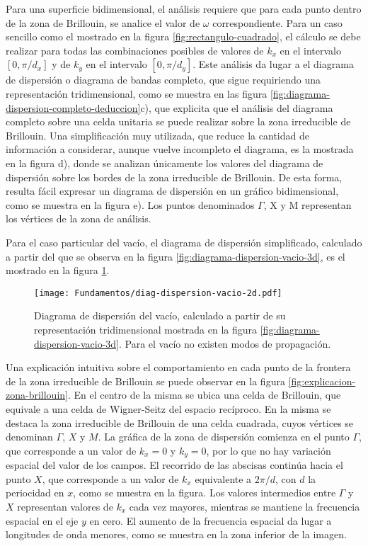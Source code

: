 Para una superficie bidimensional, el análisis requiere que para cada punto dentro de la zona de Brillouin, se analice el valor de $\omega$ correspondiente. Para un caso sencillo como el mostrado en la figura \ref{fig:rectangulo-cuadrado}, el cálculo se debe realizar para todas las combinaciones posibles de valores de $k_x$ en el intervalo $[0,\pi/d_x]$ y de $k_y$ en el intervalo $[0,\pi/d_y]$. Este análisis da lugar a el diagrama de dispersión o diagrama de bandas completo, que sigue requiriendo una representación tridimensional, como se muestra en las figura \ref{fig:diagrama-dispersion-completo-deduccion}c), que explicita que el análisis del diagrama completo sobre una celda unitaria se puede realizar sobre la zona irreducible de Brillouin. Una simplificación muy utilizada, que reduce la cantidad de información a considerar, aunque vuelve incompleto el diagrama, es la mostrada en la figura d), donde se analizan únicamente los valores del diagrama de dispersión sobre los bordes de la zona irreducible de Brillouin. De esta forma, resulta fácil expresar un diagrama de dispersión en un gráfico bidimensional, como se muestra en la figura e). Los puntos denominados $\Gamma$, X y M representan los vértices de la zona de análisis.

Para el caso particular del vacío, el diagrama de dispersión simplificado, calculado a partir del que se observa en la figura \ref{fig:diagrama-dispersion-vacio-3d}, es el mostrado en la figura \ref{fig:diagrama-dispersion-vacio-2d}.

\begin{figure}[h]
	\centering
	\texttt{[image: Fundamentos/diag-dispersion-vacio-2d.pdf]}
	\caption{Diagrama de dispersión del vacío, calculado a partir de su representación tridimensional mostrada en la figura \ref{fig:diagrama-dispersion-vacio-3d}. Para el vacío no existen modos de propagación.}
	\label{fig:diagrama-dispersion-vacio-2d}
\end{figure}

Una explicación intuitiva sobre el comportamiento en cada punto de la frontera de la zona irreducible de Brillouin se puede observar en la figura \ref{fig:explicacion-zona-brillouin}. En el centro de la misma se ubica una celda de Brillouin, que equivale a una celda de Wigner-Seitz del espacio recíproco. En la misma se destaca la zona irreducible de Brillouin de una celda cuadrada, cuyos vértices se denominan $\Gamma$, $X$ y $M$. La gráfica de la zona de dispersión comienza en el punto $\Gamma$, que corresponde a un valor de $k_x = 0$ y $k_y = 0$, por lo que no hay variación espacial del valor de los campos. El recorrido de las abscisas continúa hacia el punto $X$, que corresponde a un valor de $k_x$ equivalente a $2\pi / d$, con $d$ la periocidad en $x$, como se muestra en la figura. Los valores intermedios entre $\Gamma$ y $X$ representan valores de $k_x$ cada vez mayores, mientras se mantiene la frecuencia espacial en el eje $y$ en cero. El aumento de la frecuencia espacial da lugar a longitudes de onda menores, como se muestra en la zona inferior de la imagen.

